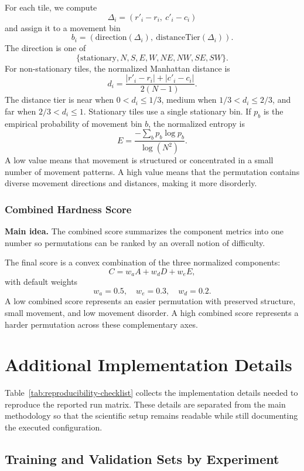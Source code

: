 \documentclass[12pt]{article}
\begin{document}
For each tile, we compute
\[
\Delta_i = (r'_i-r_i,\ c'_i-c_i)
\]
and assign it to a movement bin
\[
b_i = (\mathrm{direction}(\Delta_i),\ \mathrm{distanceTier}(\Delta_i)).
\]
The direction is one of
\[
\{\mathrm{stationary}, N, S, E, W, NE, NW, SE, SW\}.
\]
For non-stationary tiles, the normalized Manhattan distance is
\[
d_i = \frac{|r'_i-r_i| + |c'_i-c_i|}{2(N-1)}.
\]
The distance tier is near when $0 < d_i \leq 1/3$, medium when $1/3 < d_i \leq 2/3$, and far when $2/3 < d_i \leq 1$. Stationary tiles use a single stationary bin. If $p_b$ is the empirical probability of movement bin $b$, the normalized entropy is
\[
E = \frac{-\sum_b p_b \log p_b}{\log(N^2)}.
\]
A low value means that movement is structured or concentrated in a small number of movement patterns. A high value means that the permutation contains diverse movement directions and distances, making it more disorderly.

\subsubsection{Combined Hardness Score}

\textbf{Main idea.} The combined score summarizes the component metrics into one number so permutations can be ranked by an overall notion of difficulty.

The final score is a convex combination of the three normalized components:
\[
C = w_a A + w_d D + w_e E,
\]
with default weights
\[
w_a = 0.5,\quad w_e = 0.3,\quad w_d = 0.2.
\]
A low combined score represents an easier permutation with preserved structure, small movement, and low movement disorder. A high combined score represents a harder permutation across these complementary axes.

\section{Additional Implementation Details}
\label{sec:additional-implementation-details}

Table~\ref{tab:reproducibility-checklist} collects the implementation details needed to reproduce the reported run matrix. These details are separated from the main methodology so that the scientific setup remains readable while still documenting the executed configuration.

\subsection{Training and Validation Sets by Experiment}
\end{document}
